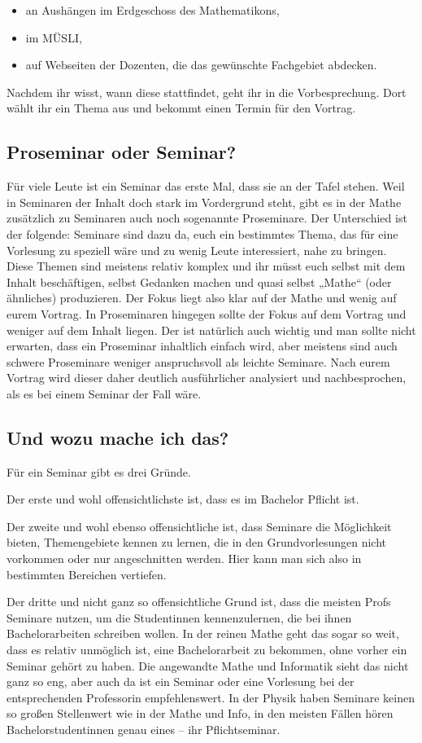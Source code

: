 \begin{itemize}
	\item an Aushängen im Erdgeschoss des Mathematikons,
	\item im MÜSLI,
	\item auf Webseiten der Dozenten, die das gewünschte Fachgebiet abdecken.
\end{itemize}

Nachdem ihr wisst, wann diese stattfindet, geht ihr in die Vorbesprechung. Dort wählt ihr ein Thema aus und bekommt einen Termin für den Vortrag.

\subsection{Proseminar oder Seminar?}
Für viele Leute ist ein Seminar das erste Mal, dass sie an der Tafel stehen. Weil in Seminaren der Inhalt doch stark im Vordergrund steht, gibt es in der Mathe zusätzlich zu Seminaren auch noch sogenannte Proseminare. Der Unterschied ist der folgende: Seminare sind dazu da, euch ein bestimmtes Thema, das für eine Vorlesung zu speziell wäre und zu wenig Leute interessiert, nahe zu bringen. Diese Themen sind meistens relativ komplex und ihr müsst euch selbst mit dem Inhalt beschäftigen, selbst Gedanken machen und quasi selbst „Mathe“ (oder ähnliches) produzieren. Der Fokus liegt also klar auf der Mathe und wenig auf eurem Vortrag. In Proseminaren hingegen sollte der Fokus auf dem Vortrag und weniger auf dem Inhalt liegen. Der ist natürlich auch wichtig und man sollte nicht erwarten, dass ein Proseminar inhaltlich einfach wird, aber meistens sind auch schwere Proseminare weniger anspruchsvoll als leichte Seminare. Nach eurem Vortrag wird dieser daher deutlich ausführlicher analysiert und nachbesprochen, als es bei einem Seminar der Fall wäre.

\subsection{Und wozu mache ich das?}
Für ein Seminar gibt es drei Gründe.

Der erste und wohl offensichtlichste ist, dass es im Bachelor Pflicht ist.

Der zweite und wohl ebenso offensichtliche ist, dass Seminare die Möglichkeit bieten, Themengebiete kennen zu lernen, die in den Grundvorlesungen nicht vorkommen oder nur angeschnitten werden. Hier kann man sich also in bestimmten Bereichen vertiefen.

Der dritte und nicht ganz so offensichtliche Grund ist, dass die meisten Profs Seminare nutzen, um die Studentinnen kennenzulernen, die bei ihnen Bachelorarbeiten schreiben wollen. In der reinen Mathe geht das sogar so weit, dass es relativ unmöglich ist, eine Bachelorarbeit zu bekommen, ohne vorher ein Seminar gehört zu haben. Die angewandte Mathe und Informatik sieht das nicht ganz so eng, aber auch da ist ein Seminar oder eine Vorlesung bei der entsprechenden Professorin empfehlenswert. In der Physik haben Seminare keinen so großen Stellenwert wie in der Mathe und Info, in den meisten Fällen hören Bachelorstudentinnen genau eines -- ihr Pflichtseminar.
